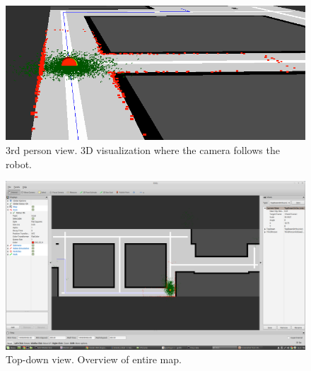 \begin{figure}[H]
\centering
\includegraphics[scale=0.50]{images/rviz_follow}
\caption{3rd person view. 3D visualization where the camera follows the robot.}
\label{fig:rviz_follow}
\end{figure}

\begin{figure}[H]
\centering
\includegraphics[scale=0.20]{images/rviz_top}
\caption{Top-down view. Overview of entire map.}
\label{fig:rviz_top}
\end{figure}
